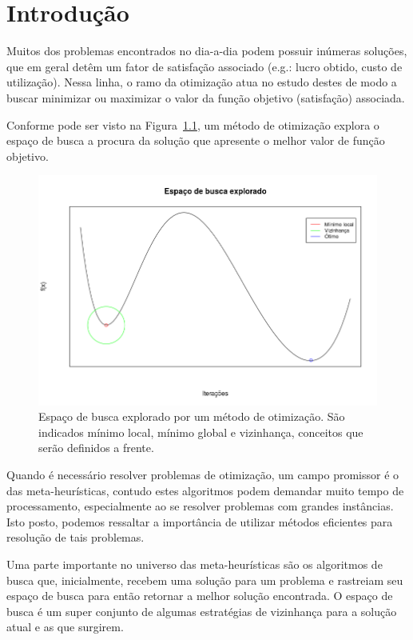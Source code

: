 \chapter{Introdução}\label{cap:introducao}

Muitos dos problemas encontrados no dia-a-dia podem possuir inúmeras soluções, que em geral detêm um fator de satisfação associado (e.g.: lucro obtido, custo de utilização).
Nessa linha, o ramo da otimização atua no estudo destes de modo a buscar minimizar ou maximizar o valor da função objetivo (satisfação) associada.

Conforme pode ser visto na Figura~\ref{fig:espacoDeBusca}, um método de otimização explora o espaço de busca a procura da solução que apresente o melhor valor de função objetivo.

\begin{figure}[htpb]
    \centering
    \includegraphics[scale=0.6]{figuras/desenharCurva-semEixo.png}
    \caption{Espaço de busca explorado por um método de otimização. São indicados mínimo local, mínimo global e vizinhança, conceitos que serão definidos a frente.}
    \label{fig:espacoDeBusca}
\end{figure}

Quando é necessário resolver problemas de otimização, um campo promissor é o das meta-heurísticas, contudo estes algoritmos podem demandar muito tempo de processamento, especialmente ao se resolver problemas com grandes instâncias. Isto posto, podemos ressaltar a importância de utilizar métodos eficientes para resolução de tais problemas.

Uma parte importante no universo das meta-heurísticas são os algoritmos de busca que, inicialmente, recebem uma solução para um problema e rastreiam seu espaço de busca para então retornar a melhor solução encontrada.
O espaço de busca é um super conjunto de algumas estratégias de vizinhança para a solução atual e as que surgirem.

